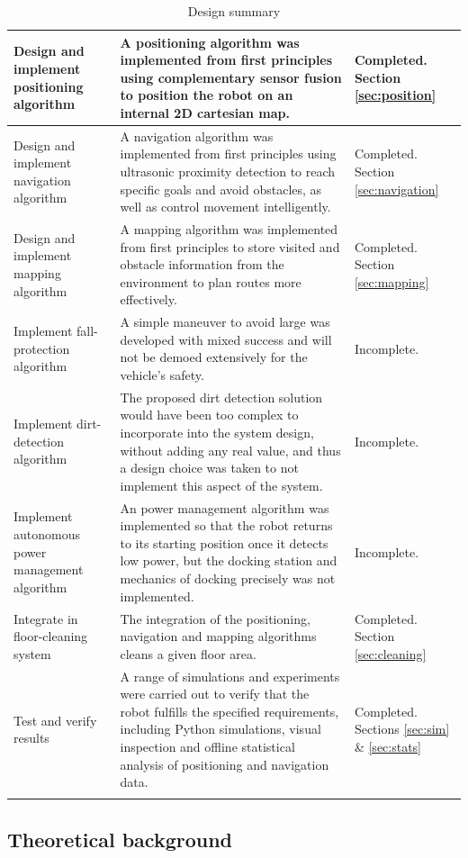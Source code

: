 \begin{longtable}[H]{|p{}|p{}|p{}|}
    Design and implement positioning algorithm &
    A positioning algorithm was implemented from first principles using complementary sensor fusion to position the robot on an internal 2D cartesian map. &
    Completed. Section \ref{sec:position} \\ \hline
    Design and implement navigation algorithm &
    A navigation algorithm was implemented from first principles using ultrasonic proximity detection to reach specific goals and avoid obstacles, as well as control movement intelligently. &
    Completed. Section \ref{sec:navigation} \\ \hline
    Design and implement mapping algorithm &
    A mapping algorithm was implemented from first principles to store visited and obstacle information from the environment to plan routes more effectively. &
    Completed. Section \ref{sec:mapping} \\ \hline
    Implement fall-protection algorithm &
    A simple maneuver to avoid large was developed with mixed success and will not be demoed extensively for the vehicle's safety. &
    Incomplete. \\ \hline
    Implement dirt-detection algorithm &
    The proposed dirt detection solution would have been too complex to incorporate into the system design, without adding any real value, and thus a design choice was taken to not implement this aspect of the system. &
    Incomplete. \\ \hline
    Implement autonomous power management algorithm & 
    An power management algorithm was implemented so that the robot returns to its starting position once it detects low power, but the docking station and mechanics of docking precisely was not implemented. &
    Incomplete. \\ \hline
    Integrate in floor-cleaning system &
    The integration of the positioning, navigation and mapping algorithms cleans a given floor area. &
    Completed. Section \ref{sec:cleaning} \\ \hline
    Test and verify results &
    A range of simulations and experiments were carried out to verify that the robot fulfills the specified requirements, including Python simulations, visual inspection and offline statistical analysis of positioning and navigation data. &
    Completed. Sections \ref{sec:sim} \& \ref{sec:stats} \\ \hline
    \caption{Design summary}
    \label{tab:design_sum}
\end{longtable}

\subsection{Theoretical background}
\label{sec:theory}

